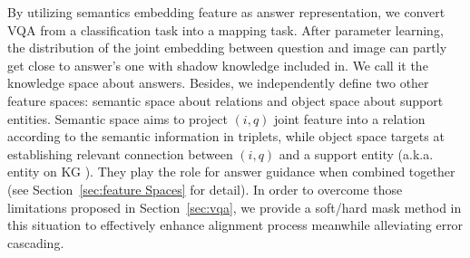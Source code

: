 \documentclass[runningheads]{llncs}
\begin{document}
By utilizing semantics embedding feature as answer representation, we convert VQA from a classification task into a mapping task. After parameter learning, the distribution of the joint embedding between question and image can partly get close to answer's one  with shadow knowledge included in. We call it the knowledge space about answers.
Besides, we independently define two other feature spaces: semantic space about relations and object space about support entities.
Semantic space aims to project $(i,q)$ joint feature into a relation according to the semantic information in triplets, while object space targets at establishing relevant connection between  $(i,q)$ and a support entity (a.k.a. entity on KG ).
They play the role for answer guidance when combined together (see Section~\ref{sec:feature Spaces} for detail).
In order to overcome those limitations proposed in Section~\ref{sec:vqa}, we provide a soft/hard mask method in this situation to effectively enhance alignment process meanwhile alleviating error cascading.
\end{document}
